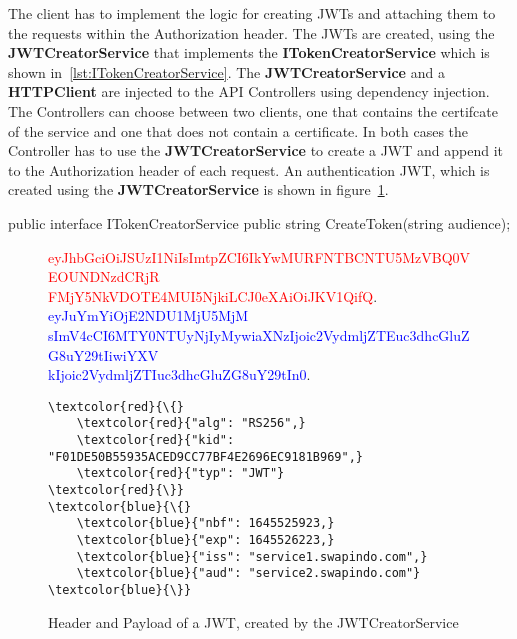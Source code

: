 The client has to implement the logic for creating JWTs and attaching them to the requests within the Authorization header.
The JWTs are created, using the \textbf{JWTCreatorService} that implements the \textbf{ITokenCreatorService} which is shown in~\ref{lst:ITokenCreatorService}.
The \textbf{JWTCreatorService} and a \textbf{HTTPClient} are injected to the API Controllers using dependency injection.
The Controllers can choose between two clients, one that contains the certifcate of the service and one that does not contain a certificate.
In both cases the Controller has to use the \textbf{JWTCreatorService} to create a JWT and append it to the Authorization header of each request.
An authentication JWT, which is created using the \textbf{JWTCreatorService} is shown in figure~\ref{fig:jwt_en_decoded}.

\noindent \begin{minipage}{\linewidth}
	\begin{CsCode}[label={lst:ITokenCreatorService}, caption={ITokenCreatorService interface, which is injected to the API Controllers},captionpos=b]
		public interface ITokenCreatorService {
			public string CreateToken(string audience);
		}
	\end{CsCode}
\end{minipage}

\begin{figure}
	\begin{centering}
	\end{centering}
	\textcolor{red}{eyJhbGciOiJSUzI1NiIsImtpZCI6IkYwMURFNTBCNTU5MzVBQ0VEOUNDNzdCRjR\\FMjY5NkVDOTE4MUI5NjkiLCJ0eXAiOiJKV1QifQ}.
	\textcolor{blue}{eyJuYmYiOjE2NDU1MjU5MjM\\sImV4cCI6MTY0NTUyNjIyMywiaXNzIjoic2VydmljZTEuc3dhcGluZG8uY29tIiwiYXV\\kIjoic2VydmljZTIuc3dhcGluZG8uY29tIn0}.
	\\ 
	\begin{Verbatim}[commandchars=\\\{\}]
\textcolor{red}{\{} 
	\textcolor{red}{"alg": "RS256",}
	\textcolor{red}{"kid": "F01DE50B55935ACED9CC77BF4E2696EC9181B969",}
	\textcolor{red}{"typ": "JWT"} 
\textcolor{red}{\}}
\textcolor{blue}{\{} 
	\textcolor{blue}{"nbf": 1645525923,}
	\textcolor{blue}{"exp": 1645526223,}
	\textcolor{blue}{"iss": "service1.swapindo.com",}
	\textcolor{blue}{"aud": "service2.swapindo.com"} 
\textcolor{blue}{\}}
	\end{Verbatim}
	\caption{Header and Payload of a JWT, created by the JWTCreatorService}
	\label{fig:jwt_en_decoded}
\end{figure}

